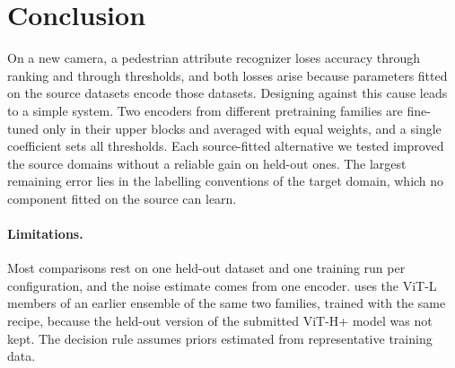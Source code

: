 \documentclass[10pt,twocolumn,letterpaper]{article}
\begin{document}
\begin{table}[t]
\centering\small
\setlength{\tabcolsep}{3pt}
\caption{Submissions to UPAR 2027 Track~1 and the protocol scores of their recipes.}
\label{tab:test}
\end{table}

\section{Conclusion}
\label{sec:conclusion}

On a new camera, a pedestrian attribute recognizer loses accuracy through ranking and through thresholds, and both losses arise because parameters fitted on the source datasets encode those datasets. Designing against this cause leads to a simple system. Two encoders from different pretraining families are fine-tuned only in their upper blocks and averaged with equal weights, and a single coefficient sets all thresholds. Each source-fitted alternative we tested improved the source domains without a reliable gain on held-out ones. The largest remaining error lies in the labelling conventions of the target domain, which no component fitted on the source can learn.

\paragraph{Limitations.} Most comparisons rest on one held-out dataset and one training run per configuration, and the noise estimate comes from one encoder.  uses the ViT-L members of an earlier ensemble of the same two families, trained with the same recipe, because the held-out version of the submitted ViT-H+ model was not kept. The decision rule assumes priors estimated from representative training data.
\end{document}
